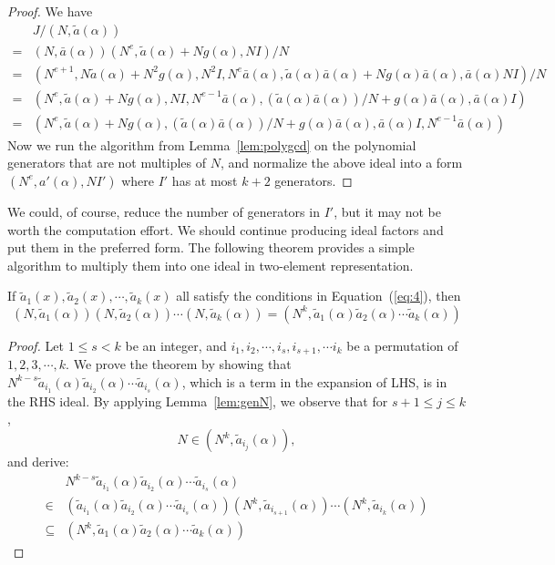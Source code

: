 \documentclass[runningheads, letter]{llncs}
\begin{document}
\begin{proof}
  We have
\begin{align*}
  &J/ (N, \tilde{a}(\alpha))\\
  =&  (N, \bar{a}(\alpha))(N^e, \tilde{a}(\alpha) +N g(\alpha), N I)/N\\
  =&  (N^{e+1}, N \tilde{a}(\alpha) +N^2 g(\alpha),
     N^2 I, N^{e} \bar{a}(\alpha),
      \tilde{a}(\alpha) \bar{a}(\alpha)+ N g(\alpha)\bar{a}(\alpha),
     \bar{a}(\alpha) N I)/N\\
  =&  (N^{e},  \tilde{a}(\alpha) +N g(\alpha),
     N I, N^{e-1} \bar{a}(\alpha),
     ( \tilde{a}(\alpha) \bar{a}(\alpha) )/N
     + g(\alpha)\bar{a}(\alpha),
     \bar{a}(\alpha)  I)\\
  =&  (N^{e},  \tilde{a}(\alpha) +N g(\alpha),
     ( \tilde{a}(\alpha) \bar{a}(\alpha) )/N
     + g(\alpha)\bar{a}(\alpha),
     \bar{a}(\alpha)  I, N^{e-1} \bar{a}(\alpha))
\end{align*}
Now we run the algorithm from Lemma~\ref{lem:polygcd} on
the polynomial generators that are not multiples of
\( N \), and normalize the above ideal into a form
\( (N^e, a'(\alpha) , N I') \)
where \( I' \) has at most \( k+2 \) generators.
\end{proof}

%
%
%
%
%
We could, of course, reduce the number of generators in \( I' \),
but it may not be worth the computation effort.
We should continue producing ideal factors and put them in
the preferred form.
%
%
The following theorem provides a simple algorithm
to multiply them into one ideal in two-element representation.

\begin{theorem}
  If \( \tilde{a}_1(x), \tilde{a}_2(x), \cdots, \tilde{a}_k(x) \) all
  satisfy the conditions in Equation~(\ref{eq:4}),
  then
  \[ (N, \tilde{a}_1(\alpha)) (N, \tilde{a}_2 (\alpha)) \cdots (N, \tilde{a}_k(\alpha))
  = (N^k, \tilde{a}_1(\alpha)\tilde{a}_2(\alpha)\cdots \tilde{a}_k(\alpha))\]
\end{theorem}

\begin{proof}
  Let \( 1\leq s < k \) be an integer,
  and \( i_1, i_2, \cdots, i_s, i_{s+1}, \cdots i_k \)
  be a permutation of \( 1, 2, 3, \cdots, k \).
  We prove the theorem by showing that 
  \( N^{k-s} \tilde{a}_{i_1}(\alpha) \tilde{a}_{i_2}(\alpha) \cdots \tilde{a}_{i_s}(\alpha)\), which is a term in the expansion of LHS,
  is in the RHS ideal. 
  By applying Lemma~\ref{lem:genN}, we observe that
  for \( s+1 \leq j \leq k \),
  \[ N \in  (N^k, \tilde{a}_{i_{ j }}(\alpha) ), \]
  and derive:
  \begin{align*}
     & N^{k-s} \tilde{a}_{i_1}(\alpha) \tilde{a}_{i_2}(\alpha) \cdots \tilde{a}_{i_s}(\alpha)\\
    \in& ( \tilde{a}_{i_1}(\alpha) \tilde{a}_{i_2}(\alpha) \cdots \tilde{a}_{i_s}(\alpha)  )(N^k, \tilde{a}_{i_{s+1}}(\alpha) )
          \cdots (N^k, \tilde{a}_{i_k}(\alpha) )\\
  \subseteq& (N^k, \tilde{a}_1 (\alpha)\tilde{a}_2(\alpha)\cdots \tilde{a}_k(\alpha))
  \end{align*}
\end{proof}
\end{document}
